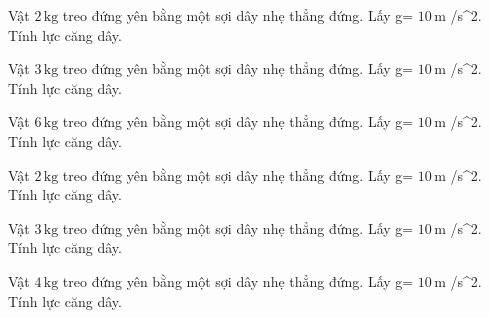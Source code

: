 \begin{ex}
Vật $2\,\text{kg}$ treo đứng yên bằng một sợi dây nhẹ thẳng đứng. Lấy g= $10\,\text{m}$ /s^2. Tính lực căng dây.
\end{ex}

\begin{ex}
Vật $3\,\text{kg}$ treo đứng yên bằng một sợi dây nhẹ thẳng đứng. Lấy g= $10\,\text{m}$ /s^2. Tính lực căng dây.
\end{ex}

\begin{bt}
Vật $6\,\text{kg}$ treo đứng yên bằng một sợi dây nhẹ thẳng đứng. Lấy g= $10\,\text{m}$ /s^2. Tính lực căng dây.
\end{bt}

\begin{bt}
Vật $2\,\text{kg}$ treo đứng yên bằng một sợi dây nhẹ thẳng đứng. Lấy g= $10\,\text{m}$ /s^2. Tính lực căng dây.
\end{bt}

\begin{bt}
Vật $3\,\text{kg}$ treo đứng yên bằng một sợi dây nhẹ thẳng đứng. Lấy g= $10\,\text{m}$ /s^2. Tính lực căng dây.
\end{bt}

\begin{bt}
Vật $4\,\text{kg}$ treo đứng yên bằng một sợi dây nhẹ thẳng đứng. Lấy g= $10\,\text{m}$ /s^2. Tính lực căng dây.
\end{bt}

